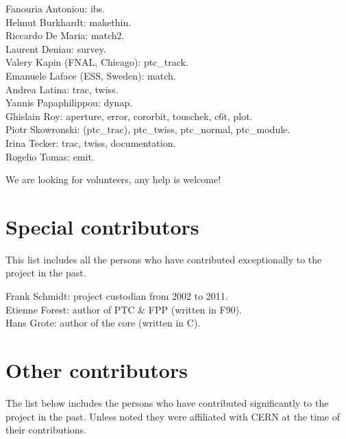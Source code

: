 Fanouria Antoniou: ibs.\\
Helmut Burkhardt: makethin.\\
Riccardo De Maria: match2.\\
Laurent Deniau: survey.\\
Valery Kapin (FNAL, Chicago): ptc\_track.\\
Emanuele Laface (ESS, Sweden): match.\\
Andrea Latina: trac, twiss.\\
Yannis Papaphilippou: dynap.\\
Ghislain Roy: aperture, error, cororbit, touschek, c6t, plot.\\
Piotr Skowronski: (ptc\_trac), ptc\_twiss, ptc\_normal, ptc\_module.\\
Irina Tecker: trac, twiss, documentation.\\
Rogelio Tomas: emit.

We are looking for volunteers, any help is welcome!


\section{Special contributors}

This list includes all the persons who have contributed exceptionally to the project in the past.

Frank Schmidt: project custodian from 2002 to 2011. \\
Etienne Forest: author of PTC \& FPP (written in F90). \\
Hans Grote: author of the core (written in C).


\section{Other contributors}

The list below includes the persons who have contributed significantly
to the \madx project in the past. Unless noted they were affiliated with
CERN at the time of their contributions. 

